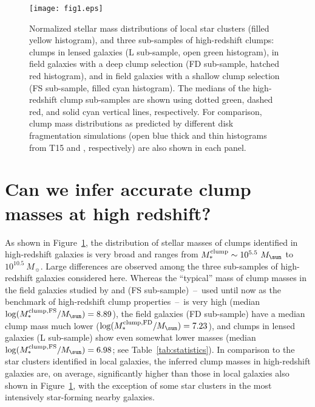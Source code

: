 \documentclass[twocolumn]{aastex61}
\begin{document}
\begin{figure}
\centering
\texttt{[image: fig1.eps]}
\caption{Normalized stellar mass distributions of local star clusters (filled yellow histogram), and three sub-samples of high-redshift clumps: clumps in lensed galaxies (L sub-sample, open green histogram), in field galaxies with a deep clump selection (FD sub-sample, hatched red histogram), and in field galaxies with a shallow clump selection (FS sub-sample, filled cyan histogram). The medians of the high-redshift clump sub-samples are shown using dotted green, dashed red, and solid cyan vertical lines, respectively. For comparison, clump mass distributions as predicted by different disk fragmentation simulations (open blue thick and thin histograms from T15 and \citet{ceverino12}, respectively) are also shown in each panel.} 
\label{fig:clump-M*}
\end{figure}
%

\section{Can we infer accurate clump masses at high redshift?}
\label{sect:results}

As shown in Figure~\ref{fig:clump-M*}, the distribution of stellar masses of 
clumps identified in high-redshift galaxies is very broad and ranges from 
$M_*^{\rm clump}\sim 10^{5.5}~M_{\sun}$ to $10^{10.5}~M_{\sun}$. Large 
differences are observed among the three sub-samples of high-redshift galaxies 
considered here. Whereas the ``typical'' mass of clump masses in the field 
galaxies studied by \citet{forster11} and \citet{guo12} (FS sub-sample)~--~used 
until now as the benchmark of high-redshift clump properties~--~is very high 
(median $\log (M_*^{\rm clump,FS}/M_{\sun}) = 8.89$), the \citet{elmegreen13} 
field galaxies (FD sub-sample) have a median clump mass much lower 
($\log (M_*^{\rm clump,FD}/M_{\sun}) = 7.23$), and clumps in lensed galaxies 
(L sub-sample) show even somewhat lower masses (median 
$\log (M_*^{\rm clump,FS}/M_{\sun}) = 6.98$; see Table~\ref{tab:statistics}). 
In comparison to the star clusters identified in local galaxies, the inferred 
clump masses in high-redshift galaxies are, on average, significantly higher 
than those in local galaxies also shown in Figure~\ref{fig:clump-M*}, with the 
exception of some star clusters in the most intensively star-forming nearby 
galaxies.
\end{document}

